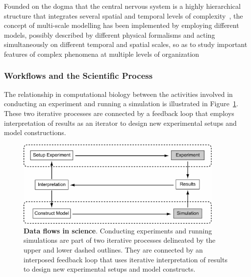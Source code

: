 \documentclass{article}
\begin{document}
Founded on the dogma that the central nervous system is a highly hierarchical structure that integrates several spatial and temporal levels of complexity~\cite{bouteiller11}, the concept of multi-scale modelling has been implemented by employing different models, possibly described by different physical formalisms and acting simultaneously on different temporal and spatial scales, so as to study important features of complex phenomena at multiple levels of organization~\cite{djurfeldt07}



\subsubsection{Workflows and the Scientific Process}

The relationship in computational biology between the activities involved in conducting an experiment and running a simulation is illustrated in Figure~\ref{fig:exp-sim}. These two iterative processes are connected by a feedback loop that employs interpretation of results as an iterator to design new experimental setups and model constructions.

\begin{figure}[h!t]
  \begin{center}
    \includegraphics[width=4in]{figures/exp-sim.pdf}
  \end{center}
  \caption{ \small{\textbf{Data flows in science}. Conducting experiments and running simulations are part of two iterative processes delineated by the upper and lower dashed outlines. They are connected by an interposed feedback loop that uses iterative interpretation of results to design new experimental setups and model constructs.}}
    \label{fig:exp-sim}
\end{figure}
\end{document}
